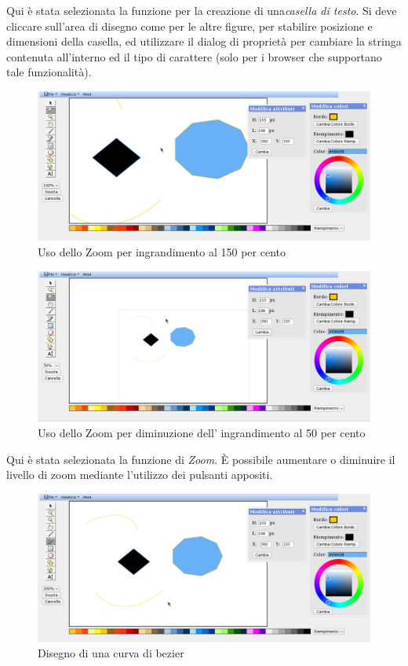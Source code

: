  
\vspace{100pt}
Qui \`e stata selezionata la funzione per la creazione di una\textit{casella di testo}. Si deve cliccare sull'area di disegno come per le altre figure, per stabilire posizione e dimensioni della casella, ed utilizzare il dialog di propriet\`a per cambiare la stringa contenuta all'interno ed il tipo di carattere (solo per i browser che supportano tale funzionalit\` a).
\newpage
 
 
\begin{figure}[!ht]
\centering
\includegraphics[scale=0.4]{images/zoom_piu.png}
\caption{Uso dello Zoom per ingrandimento al 150 per cento}
\end{figure}
 
\begin{figure}[!ht]
\centering
\includegraphics[scale=0.4]{images/zoom_meno.png}
\caption{Uso dello Zoom per diminuzione dell' ingrandimento al 50 per cento}
\end{figure}
 
\vspace{100pt}
Qui \`e stata selezionata la funzione di \textit{Zoom}. \`E possibile aumentare o diminuire il livello di zoom mediante l'utilizzo dei pulsanti appositi.
 
 
 
\begin{figure}[!ht]
\centering
\includegraphics[scale=0.4]{images/bezier.png}
\caption{Disegno di una curva di bezier}
\end{figure}
 
